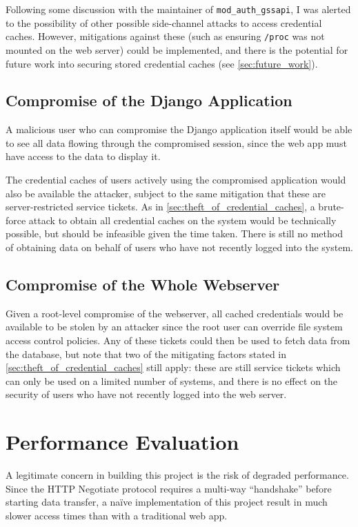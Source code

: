 \documentclass[12pt]{report}
\begin{document}
Following some discussion with the maintainer of \verb+mod_auth_gssapi+, I was alerted to the possibility of other possible side-channel attacks to access credential caches. However, mitigations against these (such as ensuring \verb+/proc+ was not mounted on the web server) could be implemented, and there is the potential for future work into securing stored credential caches (see \autoref{sec:future_work}).

\subsection{Compromise of the Django Application}
A malicious user who can compromise the Django application itself would be able to see all data flowing through the compromised session, since the web app must have access to the data to display it.

The credential caches of users actively using the compromised application would also be available the attacker, subject to the same mitigation that these are server-restricted service tickets. As in \autoref{sec:theft_of_credential_caches}, a brute-force attack to obtain all credential caches on the system would be technically possible, but should be infeasible given the time taken. There is still no method of obtaining data on behalf of users who have not recently logged into the system.

\subsection{Compromise of the Whole Webserver}
Given a root-level compromise of the webserver, all cached credentials would be available to be stolen by an attacker since the root user can override file system access control policies. Any of these tickets could then be used to fetch data from the database, but note that two of the mitigating factors stated in \autoref{sec:theft_of_credential_caches} still apply: these are still service tickets which can only be used on a limited number of systems, and there is no effect on the security of users who have not recently logged into the web server.

\section{Performance Evaluation}
\label{sec:performance_evaluation}
A legitimate concern in building this project is the risk of degraded performance. Since the HTTP Negotiate protocol requires a multi-way ``handshake'' before starting data transfer, a na\"ive implementation of this project result in much slower access times than with a traditional web app.
\end{document}
